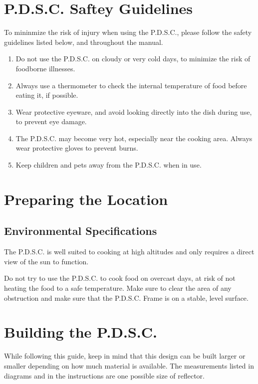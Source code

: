 \documentclass{article}
\begin{document}
    \section{P.D.S.C. Saftey Guidelines}
        To mininmize the risk of injury when using the P.D.S.C., please follow the safety guidelines listed below, and throughout the manual.
        \begin{enumerate}
            \item Do not use the P.D.S.C. on cloudy or very cold days, to minimize the risk of foodborne illnesses.
            \item Always use a thermometer to check the internal temperature of food before eating it, if possible.
            \item Wear protective eyeware, and avoid looking directly into the dish during use, to prevent eye damage.
            \item The P.D.S.C. may become very hot, especially near the cooking area.  Always wear protective gloves to prevent burns.
            \item Keep children and pets away from the P.D.S.C. when in use.
        \end{enumerate}
    \section{Preparing the Location}
        \subsection{Environmental Specifications}
        The P.D.S.C. is well suited to cooking at high altitudes and only requires
        a direct view of the sun to function.  
        
        Do not try to use the P.D.S.C. to cook food 
        on overcast days, at risk of not heating the food to a safe temperature. 
        Make sure to clear the area of any obstruction and make sure that the P.D.S.C. Frame is 
        on a stable, level surface.

    \section{Building the P.D.S.C.}
        While following this guide, keep in mind that this design can be built
        larger or smaller depending on how much material is available.  The measurements listed
        in diagrams and in the instructions are one possible size of reflector. 
        
\end{document}
